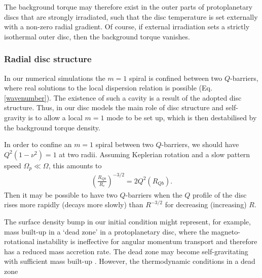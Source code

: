 {  %



  The background torque may therefore exist in the outer
  parts of protoplanetary discs that are strongly irradiated, such
  that the disc temperature is set externally with a non-zero radial
  gradient.  Of course, if external irradiation sets a strictly
  isothermal outer disc, then the background torque vanishes.    

 
  \subsubsection{Radial disc structure}
  In our numerical simulations the 
  $m=1$ spiral is confined between two $Q$-barriers, where real solutions to the local
  dispersion relation is possible (Eq. \ref{wavenumber}). The
  existence of such a cavity is a result of the adopted disc
  structure. Thus, in our disc models the main role of disc structure
  and self-gravity is to 
  allow a local $m=1$ mode to be set up, which is then 
  destabilised by the background torque density. 
  
  In order to confine an $m=1$ spiral between two $Q$-barriers, we
  should have $Q^2(1-\nu^2)=1$ at two radii. Assuming 
  Keplerian rotation and a slow pattern speed $\Omega_p\ll\Omega$, this amounts to
  \begin{align}\label{qb_cond}
    \left(\frac{R_{Qb}}{R_c}\right)^{-3/2} = 2Q^2(R_{Qb}). 
  \end{align}
  Then it may be possible to have two $Q$-barriers when the $Q$ profile
  of the disc rises more rapidly (decays more slowly) than $R^{-3/2}$
  for decreasing (increasing) $R$. 
  
  The surface density bump in our initial condition might represent,
  for example, mass built-up in a 
`dead zone' in a protoplanetary
  disc, where the magneto-rotational 
  instability is ineffective for angular momentum transport
  \citep{gammie96,turner08,landry13} and therefore has a reduced mass
  accretion rate. The dead zone may become 
  self-gravitating with sufficient mass built-up
  \citep{armitage01,martin12,martin12b,zhu09,zhu10,zhu10b,bae13,bae14}. 
  However, the thermodynamic conditions in a dead zone 


}
